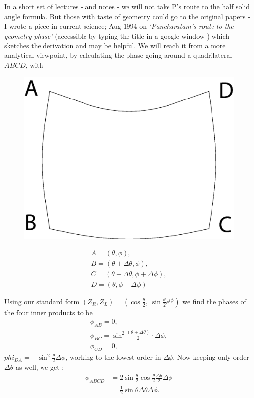 In a short set of lectures - and notes - we will not take P’s route to the half
solid angle formula. But those with taste of geometry could go to the original
papers - I wrote a piece in current science; Aug 1994 on \textit{`Pancharatam's route
to the geometry phase'} (accessible by typing the title in a google window )
which sketches the derivation and may be helpful. We will reach it from a
more analytical viewpoint, by calculating the phase going around a quadrilateral
$ABCD$, with
\begin{figure}[H]
\centering
\includegraphics[scale=0.16]{src/images/chap26/12.jpg}
\end{figure}
\begin{gather*}
A = (\theta, \phi),\\
B = (\theta + \Delta \theta, \phi),\\
C = (\theta + \Delta \theta, \phi + \Delta \phi),\\
D = (\theta, \phi + \Delta \phi)
\end{gather*}

Using our standard form $(Z_R , Z_L ) = (\cos \frac{\theta}{2}, ~ \sin \frac{\theta}{2} e^{i\phi})$ we find the phases
of the four inner products to be
\begin{gather*}
\phi_{AB} = 0,\\
\phi_{BC} = \sin^2 \frac{(\theta + \Delta \theta)}{2} \cdot \Delta \phi,\\
\phi_{CD} = 0,
\end{gather*}
$phi_{DA} = -\sin^2 \frac{\theta}{2} \Delta \phi$, working to the lowest order in $\Delta \phi$. 
Now keeping only order $\Delta \theta$ as well, we get :
\begin{align*}
\phi_{ABCD} &= 2 \sin \frac{\theta}{2} \cos \frac{\theta}{2} \frac{\Delta \theta }{2} \Delta \phi\\
&= \frac{1}{2} \sin \theta \Delta \theta \Delta \phi.
\end{align*}

